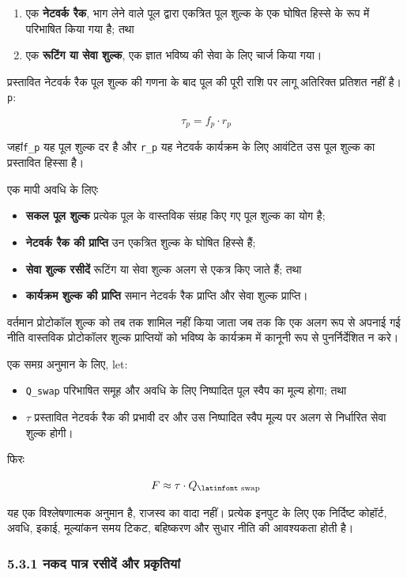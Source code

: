 \documentclass[11pt]{article}
\begin{document}
\begin{enumerate}[leftmargin=*]
\item एक \textbf{नेटवर्क रैक}, भाग लेने वाले पूल द्वारा एकत्रित पूल शुल्क के एक घोषित हिस्से के रूप में परिभाषित किया गया है; तथा
\item एक \textbf{रूटिंग या सेवा शुल्क}, एक ज्ञात भविष्य की सेवा के लिए चार्ज किया गया।
\end{enumerate}
प्रस्तावित नेटवर्क रैक पूल शुल्क की गणना के बाद पूल की पूरी राशि पर लागू अतिरिक्त प्रतिशत नहीं है।\texttt{p}:

\[
\tau_p = f_p \cdot r_p
\]

जहां\texttt{f\_p} यह पूल शुल्क दर है और \texttt{r\_p} यह नेटवर्क कार्यक्रम के लिए आवंटित उस पूल शुल्क का प्रस्तावित हिस्सा है।

एक मापी अवधि के लिएः

\begin{itemize}[leftmargin=*]
\item \textbf{सकल पूल शुल्क} प्रत्येक पूल के वास्तविक संग्रह किए गए पूल शुल्क का योग है;
\item \textbf{नेटवर्क रैक की प्राप्ति} उन एकत्रित शुल्क के घोषित हिस्से हैं;
\item \textbf{सेवा शुल्क रसीदें} रूटिंग या सेवा शुल्क अलग से एकत्र किए जाते हैं; तथा
\item \textbf{कार्यक्रम शुल्क की प्राप्ति} समान नेटवर्क रैक प्राप्ति और सेवा शुल्क प्राप्ति।
\end{itemize}
वर्तमान प्रोटोकॉल शुल्क को तब तक शामिल नहीं किया जाता जब तक कि एक अलग रूप से अपनाई गई नीति वास्तविक प्रोटोकॉलर शुल्क प्राप्तियों को भविष्य के कार्यक्रम में कानूनी रूप से पुनर्निर्देशित न करे।

एक समग्र अनुमान के लिए, let:

\begin{itemize}[leftmargin=*]
\item \texttt{Q\_swap} परिभाषित समूह और अवधि के लिए निष्पादित पूल स्वैप का मूल्य होगा; तथा
\item \texttt{$\tau$} प्रस्तावित नेटवर्क रैक की प्रभावी दर और उस निष्पादित स्वैप मूल्य पर अलग से निर्धारित सेवा शुल्क होगी।
\end{itemize}
फिरः

\[
F \approx \tau \cdot Q_{\text{\latinfont swap}}
\]

यह एक विश्लेषणात्मक अनुमान है, राजस्व का वादा नहीं। प्रत्येक इनपुट के लिए एक निर्दिष्ट कोहॉर्ट, अवधि, इकाई, मूल्यांकन समय टिकट, बहिष्करण और सुधार नीति की आवश्यकता होती है।

\subsubsection*{5.3.1 नकद पात्र रसीदें और प्रकृतियां}
\end{document}
